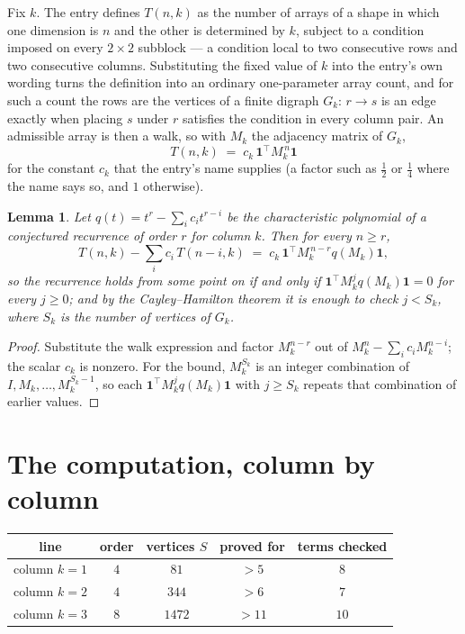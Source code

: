 \documentclass[11pt,a4paper]{article}
\theoremstyle{plain}
\newtheorem{lemma}[theorem]{Lemma}
\theoremstyle{definition}
\begin{document}
Fix $k$. The entry defines $T(n,k)$ as the number of arrays of a shape in which one dimension
is $n$ and the other is determined by $k$, subject to a condition imposed on every
$2\times2$ subblock --- a condition local to two consecutive rows and two consecutive columns.
Substituting the fixed value of $k$ into the entry's own wording turns the definition into an
ordinary one-parameter array count, and for such a count the rows are the vertices of a finite
digraph $G_k$: $r\to s$ is an edge exactly when placing $s$ under $r$ satisfies the condition
in every column pair. An admissible array is then a walk, so with $M_k$ the adjacency matrix
of $G_k$,
\[
T(n,k)\;=\;c_k\,\mathbf{1}^{\!\top}M_k^{\,n}\mathbf{1}
\]
for the constant $c_k$ that the entry's name supplies (a factor such as $\tfrac12$ or
$\tfrac14$ where the name says so, and $1$ otherwise).

\begin{lemma}\label{lem:crit}
Let $q(t)=t^{r}-\sum_i c_it^{r-i}$ be the characteristic polynomial of a conjectured
recurrence of order $r$ for column $k$. Then for every $n\ge r$,
\[
T(n,k)-\sum_i c_i\,T(n-i,k)\;=\;c_k\,\mathbf{1}^{\!\top}M_k^{\,n-r}q(M_k)\mathbf{1},
\]
so the recurrence holds from some point on if and only if
$\mathbf{1}^{\!\top}M_k^{j}q(M_k)\mathbf{1}=0$ for every $j\ge0$; and by the
Cayley--Hamilton theorem it is enough to check $j<S_k$, where $S_k$ is the number of vertices
of $G_k$.
\end{lemma}

\begin{proof}
Substitute the walk expression and factor $M_k^{n-r}$ out of $M_k^{n}-\sum_ic_iM_k^{n-i}$;
the scalar $c_k$ is nonzero. For the bound, $M_k^{S_k}$ is an integer combination of
$I,M_k,\dots,M_k^{S_k-1}$, so each $\mathbf{1}^{\!\top}M_k^{j}q(M_k)\mathbf{1}$ with
$j\ge S_k$ repeats that combination of earlier values.
\end{proof}

\section{The computation, column by column}

\begin{center}
\begin{tabular}{ccccc}
line & order & vertices $S$ & proved for & terms checked \\ \hline
column $k$$=1$ & $4$ & $81$ & $>5$ & $8$ \\
column $k$$=2$ & $4$ & $344$ & $>6$ & $7$ \\
column $k$$=3$ & $8$ & $1472$ & $>11$ & $10$ \\
\end{tabular}
\end{center}
\end{document}
